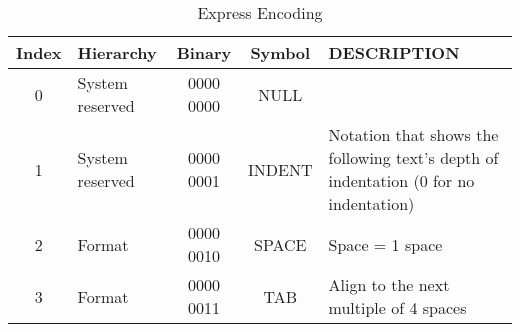 \documentclass{article}
\begin{document}
\begin{table}[htbp]
\centering
\begin{tabular}{|c|l|c|c|p{6cm}|}
\hline
Index & Hierarchy & Binary & Symbol & DESCRIPTION 
\\\hline 0 & System reserved & 0000 0000 & NULL & 
\\\hline 1 & System reserved & 0000 0001 & INDENT & Notation that shows the following text's depth of indentation (0 for no indentation)
\\\hline 2 & Format & 0000 0010 & SPACE & Space = 1 space 
\\\hline 3 & Format & 0000 0011 & TAB & Align to the next multiple of 4 spaces

\\\hline 
\end{tabular}
\caption{Express Encoding}
\end{table}
\end{document}
